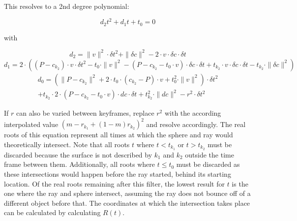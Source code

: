 This resolves to a 2nd degree polynomial:

\begin{equation}
    d_2t^2 + d_1t + t_0 = 0
\end{equation}

with

\begin{equation}
    d_2 = \|v\|^2 \cdot \delta t^2
    + \|\delta c\|^2
    - 2 \cdot v \cdot \delta c \cdot \delta t
\end{equation}
\begin{equation}
    d_1 = 2 \cdot (
    (P - c_{k_2}) \cdot v \cdot \delta t^2
    - t_0 \cdot \|v\|^2
    - (P - c_{k_2} - t_0 \cdot v) \cdot \delta c \cdot \delta t
    + t_{k_2} \cdot v \cdot \delta c \cdot \delta t
    - t_{k_2} \cdot \|\delta c\|^2
    )
\end{equation}
\begin{equation}
    \begin{split}
        d_0 = (
        \|P - c_{k_2}\|^2
        + 2 \cdot t_0 \cdot (c_{k_2} - P) \cdot v
        + t_0^2 \cdot \|v\|^2
        ) \cdot \delta t^2
        \\
        + t_{k_2} \cdot 2 \cdot (P - c_{k_2} - t_0 \cdot v) \cdot dc \cdot \delta t
        + t_{k_2}^2 \cdot \|dc\|^2
        - r^2 \cdot \delta t^2
    \end{split}
\end{equation}

If \(r\) can also be varied between keyframes,
replace \(r^2\) with the according interpolated value \((m - r_{k_1} + (1-m) r_{k_2})^2\) and resolve accordingly.
\newline
The real roots of this equation represent all times at which the sphere and ray would theoretically intersect.
Note that all roots \(t\) where \(t < t_{k_1}\) or \(t > t_{k_2}\) must be discarded
because the surface is not described by \(k_1\) and \(k_2\) outside the time frame between them.
Additionally, all roots where \(t \le t_0\) must be discarded as these intersections would happen before the ray started,
behind its starting location.
\newline
Of the real roots remaining after this filter, the lowest result for \(t\) is the one where the ray and sphere intersect,
assuming the ray does not bounce off of a different object before that.
The coordinates at which the intersection takes place can be calculated by calculating \(R(t)\).


